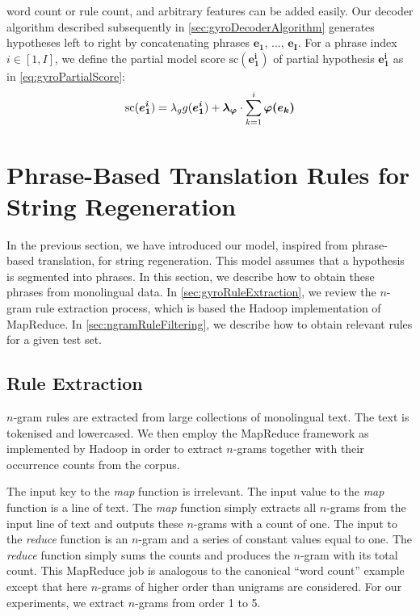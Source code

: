 word count or rule count, and arbitrary features can be added easily.
Our decoder algorithm described subsequently in
\autoref{sec:gyroDecoderAlgorithm} generates hypotheses left to right
by concatenating phrases $\bm{e_1}$, ..., $\bm{e_I}$. For a phrase index $i \in [1, I]$,
we define the partial model score $\text{sc}(\bm{e_1^i})$ of partial hypothesis $\bm{e_1^i}$ as
in \autoref{eq:gyroPartialScore}:
%
\begin{equation}
  \text{sc}(\bm{e_1^i}) = \lambda_g g(\bm{e_1^i}) + \bm{\lambda_{\varphi}} \cdot \sum_{k = 1}^i \bm{\varphi(e_k)} \\
  \label{eq:gyroPartialScore}
\end{equation}

\section{Phrase-Based Translation Rules for String Regeneration}
\label{sec:gyroPhraseBasedRules}

In the previous section, we have introduced our model, inspired from
phrase-based translation, for string regeneration.
This model assumes that a hypothesis is segmented into phrases.
In this section, we describe how to obtain these phrases
from monolingual data. In \autoref{sec:gyroRuleExtraction}, we review
the $n$-gram rule extraction process, which is based the Hadoop implementation
of MapReduce. In \autoref{sec:ngramRuleFiltering}, we describe how to obtain
relevant rules for a given test set.

\subsection{Rule Extraction}
\label{sec:gyroRuleExtraction}

$n$-gram rules are extracted from large collections of monolingual
text. The text is tokenised and lowercased. We then
employ the MapReduce
framework as implemented by Hadoop in order to extract %
$n$-grams together with their occurrence counts from the corpus.

The input key to the \emph{map} function is irrelevant.
The input value to the \emph{map} function is a line of text.
The \emph{map} function simply extracts all $n$-grams from the
input line of text and outputs these $n$-grams with a count of
one. The input to the \emph{reduce} function is an $n$-gram
and a series of constant values equal to one.
The \emph{reduce} function simply sums the counts
and produces the $n$-gram with its total count. This MapReduce
job is analogous to the canonical ``word count'' example except
that here $n$-grams of higher order than unigrams are considered.
For our experiments, we extract $n$-grams from order 1 to 5. %

